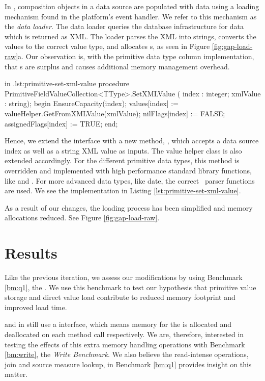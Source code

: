 In \gap, composition objects in a data source are populated with data using a loading mechanism found in the platform's event handler. We refer to this mechanism as the \textit{data loader}. The data loader queries the database infrastructure for data which is returned as XML. The loader parses the XML into strings, converts the values to the correct value type, and allocates s, as seen in Figure \ref{fig:gap-load-raw}a. Our observation is, with the primitive data type column implementation, that s are surplus and causes additional memory management overhead.

\begin{delphicode}{ in .}{lst:primitive-set-xml-value}
procedure PrimitiveFieldValueCollection<TType>.SetXMLValue
( index : integer; xmlValue : string);
begin
  EnsureCapacity(index);
  values[index] := valueHelper.GetFromXMLValue(xmlValue);
  nilFlags[index] := FALSE;
  assignedFlags[index] := TRUE;
end;
\end{delphicode}
Hence, we extend the  interface with a new method, , which accepts a data source index as well as a string XML value as inputs. The value helper class is also extended accordingly. For the different primitive data types, this method is overridden and implemented with high performance standard library functions, like  and . For more advanced data types, like date, the correct \gap~parser functions are used. We see the  implementation in Listing \ref{lst:primitive-set-xml-value}.

As a result of our changes, the loading process has been simplified and memory allocations reduced. See Figure \ref{fig:gap-load-raw}.
\section{Results}
\label{sec:storage-format-test-results}
Like the previous iteration, we assess our modifications by using Benchmark \ref{bm:q1}, the \tpchdl. We use this benchmark to test our hypothesis that primitive value storage and direct value load contribute to reduced memory footprint and improved load time. 

 and  in  still use a  interface, which means memory for the  is allocated and deallocated on each method call respectively. We are, therefore, interested in testing the effects of this extra memory handling operations with Benchmark \ref{bm:write}, the \textit{Write Benchmark}. We also believe the read-intense operations, join and source measure lookup, in Benchmark \ref{bm:q1} provides insight on this matter.

